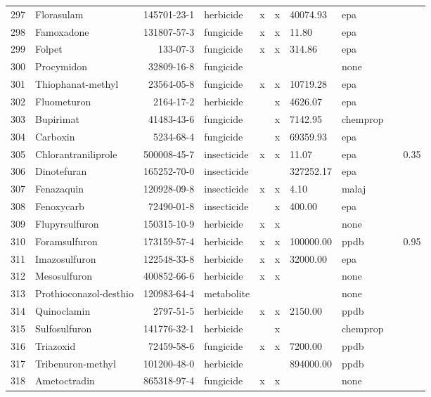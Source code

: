 \begin{longtable}{lp{3cm}rlp{0.5cm}p{0.5cm}p{1.5cm}p{1cm}p{1cm}p{1cm}}
  297 & Florasulam & 145701-23-1 & herbicide & x & x & 40074.93 & epa &  &  \\ 
  298 & Famoxadone & 131807-57-3 & fungicide & x & x & 11.80 & epa &  &  \\ 
  299 & Folpet & 133-07-3 & fungicide & x & x & 314.86 & epa &  &  \\ 
  300 & Procymidon & 32809-16-8 & fungicide &  &  &  & none &  &  \\ 
  301 & Thiophanat-methyl & 23564-05-8 & fungicide & x & x & 10719.28 & epa &  &  \\ 
  302 & Fluometuron & 2164-17-2 & herbicide &  & x & 4626.07 & epa &  &  \\ 
  303 & Bupirimat & 41483-43-6 & fungicide &  & x & 7142.95 & chemprop &  &  \\ 
  304 & Carboxin & 5234-68-4 & fungicide &  & x & 69359.93 & epa &  &  \\ 
  305 & Chlorantraniliprole & 500008-45-7 & insecticide & x & x & 11.07 & epa &  & 0.35 \\ 
  306 & Dinotefuran & 165252-70-0 & insecticide &  &  & 327252.17 & epa &  &  \\ 
  307 & Fenazaquin & 120928-09-8 & insecticide & x & x & 4.10 & malaj &  &  \\ 
  308 & Fenoxycarb & 72490-01-8 & insecticide &  & x & 400.00 & epa &  &  \\ 
  309 & Flupyrsulfuron & 150315-10-9 & herbicide & x & x &  & none &  &  \\ 
  310 & Foramsulfuron & 173159-57-4 & herbicide & x & x & 100000.00 & ppdb &  & 0.95 \\ 
  311 & Imazosulfuron & 122548-33-8 & herbicide & x & x & 32000.00 & epa &  &  \\ 
  312 & Mesosulfuron & 400852-66-6 & herbicide & x & x &  & none &  &  \\ 
  313 & Prothioconazol-desthio & 120983-64-4 & metabolite &  &  &  & none &  &  \\ 
  314 & Quinoclamin & 2797-51-5 & herbicide & x & x & 2150.00 & ppdb &  &  \\ 
  315 & Sulfosulfuron & 141776-32-1 & herbicide &  & x &  & chemprop &  &  \\ 
  316 & Triazoxid & 72459-58-6 & fungicide & x & x & 7200.00 & ppdb &  &  \\ 
  317 & Tribenuron-methyl & 101200-48-0 & herbicide &  &  & 894000.00 & ppdb &  &  \\ 
  318 & Ametoctradin & 865318-97-4 & fungicide & x & x &  & none &  &  \\ 

\end{longtable}
